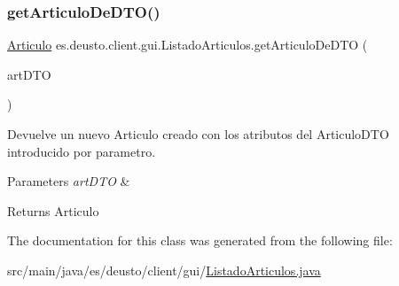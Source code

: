 \subsubsection{\texorpdfstring{getArticuloDeDTO()}{getArticuloDeDTO()}}
{\footnotesize\ttfamily \mbox{\hyperlink{classes_1_1deusto_1_1client_1_1data_1_1_articulo}{Articulo}} es.\+deusto.\+client.\+gui.\+Listado\+Articulos.\+get\+Articulo\+De\+D\+TO (\begin{DoxyParamCaption}\item[{\mbox{\hyperlink{classes_1_1deusto_1_1server_1_1dto_1_1_articulo_d_t_o}{Articulo\+D\+TO}}}]{art\+D\+TO }\end{DoxyParamCaption})}

Devuelve un nuevo Articulo creado con los atributos del Articulo\+D\+TO introducido por parametro. 
\begin{DoxyParams}{Parameters}
{\em art\+D\+TO} & \\
\hline
\end{DoxyParams}
\begin{DoxyReturn}{Returns}
Articulo 
\end{DoxyReturn}


The documentation for this class was generated from the following file\+:\begin{DoxyCompactItemize}
\item 
src/main/java/es/deusto/client/gui/\mbox{\hyperlink{_listado_articulos_8java}{Listado\+Articulos.\+java}}\end{DoxyCompactItemize}
